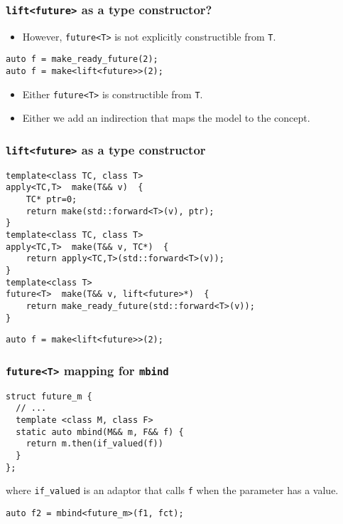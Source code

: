 \documentclass[xcolor=dvipsnames]{beamer}
\newcommand{\cpp}[1]{\lstinline{#1}}
\begin{document}
\begin{frame}[fragile]
\frametitle{\cpp{lift<future>} as a type constructor?}

\begin{itemize}
  \item However, \cpp{future<T>} is not explicitly constructible from \cpp{T}.
\end{itemize}

\begin{lstlisting}
auto f = make_ready_future(2); 
auto f = make<lift<future>>(2); 
\end{lstlisting}

\begin{itemize}
  \item Either \cpp{future<T>} is constructible from \cpp{T}.
  \item Either we add an indirection that maps the model to the concept.
\end{itemize}

\end{frame}
\begin{frame}[fragile]
\frametitle{\cpp{lift<future>} as a type constructor}

\begin{lstlisting}
template<class TC, class T>
apply<TC,T>  make(T&& v)  {
    TC* ptr=0; 
    return make(std::forward<T>(v), ptr);
}
template<class TC, class T>
apply<TC,T>  make(T&& v, TC*)  {
    return apply<TC,T>(std::forward<T>(v));
}
template<class T>
future<T>  make(T&& v, lift<future>*)  {
    return make_ready_future(std::forward<T>(v));
}
\end{lstlisting}
\begin{lstlisting}
auto f = make<lift<future>>(2); 
\end{lstlisting}

\end{frame}
\begin{frame}[fragile]
\frametitle{\cpp{future<T>} mapping for \cpp{mbind}}

\begin{lstlisting}
struct future_m {
  // ...
  template <class M, class F>
  static auto mbind(M&& m, F&& f) {
    return m.then(if_valued(f))
  }
};
\end{lstlisting}

where \cpp{if_valued} is an adaptor that calls \cpp{f} when the parameter has a value.  

\begin{lstlisting}
auto f2 = mbind<future_m>(f1, fct); 
\end{lstlisting}

\end{frame}
\end{document}
